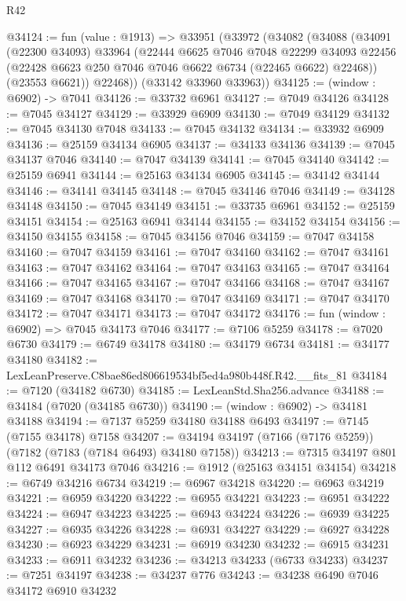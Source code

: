 \begin{lexlean}{R42}
\begin{coremodule}
{@34124 := fun (value : @1913) =>
  @33951
    (@33972
      (@34082
        (@34088
          (@34091
            (@22300 @34093)
            @33964
            (@22444
              @6625
              @7046
              @7048
              @22299
              @34093
              @22456
              (@22428 @6623 @250 @7046 @7046 @6622 @6734 (@22465 @6622) @22468))
            (@23553 @6621))
          @22468))
      (@33142 @33960 @33963))
@34125 := (window : @6902) -> @7041
@34126 := @33732 @6961
@34127 := @7049 @34126
@34128 := @7045 @34127
@34129 := @33929 @6909
@34130 := @7049 @34129
@34132 := @7045 @34130 @7048
@34133 := @7045 @34132
@34134 := @33932 @6909
@34136 := @25159 @34134 @6905
@34137 := @34133 @34136
@34139 := @7045 @34137 @7046
@34140 := @7047 @34139
@34141 := @7045 @34140
@34142 := @25159 @6941
@34144 := @25163 @34134 @6905
@34145 := @34142 @34144
@34146 := @34141 @34145
@34148 := @7045 @34146 @7046
@34149 := @34128 @34148
@34150 := @7045 @34149
@34151 := @33735 @6961
@34152 := @25159 @34151
@34154 := @25163 @6941 @34144
@34155 := @34152 @34154
@34156 := @34150 @34155
@34158 := @7045 @34156 @7046
@34159 := @7047 @34158
@34160 := @7047 @34159
@34161 := @7047 @34160
@34162 := @7047 @34161
@34163 := @7047 @34162
@34164 := @7047 @34163
@34165 := @7047 @34164
@34166 := @7047 @34165
@34167 := @7047 @34166
@34168 := @7047 @34167
@34169 := @7047 @34168
@34170 := @7047 @34169
@34171 := @7047 @34170
@34172 := @7047 @34171
@34173 := @7047 @34172
@34176 := fun (window : @6902) => @7045 @34173 @7046
@34177 := @7106 @5259
@34178 := @7020 @6730
@34179 := @6749 @34178
@34180 := @34179 @6734
@34181 := @34177 @34180
@34182 := LexLeanPreserve.C8bae86ed806619534bf5ed4a980b448f.R42.__fits_81
@34184 := @7120 (@34182 @6730)
@34185 := LexLeanStd.Sha256.advance
@34188 := @34184 (@7020 (@34185 @6730))
@34190 := (window : @6902) -> @34181 @34188
@34194 := @7137 @5259 @34180 @34188 @6493
@34197 := @7145 (@7155 @34178) @7158
@34207 := @34194 @34197 (@7166 (@7176 @5259)) (@7182 (@7183 (@7184 @6493) @34180 @7158))
@34213 := @7315 @34197 @801 @112 @6491 @34173 @7046
@34216 := @1912 (@25163 @34151 @34154)
@34218 := @6749 @34216 @6734
@34219 := @6967 @34218
@34220 := @6963 @34219
@34221 := @6959 @34220
@34222 := @6955 @34221
@34223 := @6951 @34222
@34224 := @6947 @34223
@34225 := @6943 @34224
@34226 := @6939 @34225
@34227 := @6935 @34226
@34228 := @6931 @34227
@34229 := @6927 @34228
@34230 := @6923 @34229
@34231 := @6919 @34230
@34232 := @6915 @34231
@34233 := @6911 @34232
@34236 := @34213 @34233 (@6733 @34233)
@34237 := @7251 @34197
@34238 := @34237 @776
@34243 := @34238 @6490 @7046 @34172 @6910 @34232
}
\end{coremodule}
\end{lexlean}
